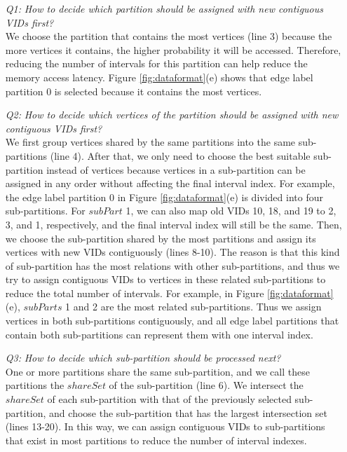 \begin{itemize}
  \item[\emph{Q1:}] \emph{How to decide which partition should be assigned with new contiguous VIDs first?}\\We choose the partition that contains the most vertices (line 3) because the more vertices it contains, the higher probability it will be accessed. Therefore, reducing the number of intervals for this partition can help reduce the memory access latency. Figure \ref{fig:dataformat}(e) shows that edge label partition 0 is selected because it contains the most vertices.
  \item[\emph{Q2:}] \emph{How to decide which vertices of the partition should be assigned with new contiguous VIDs first?}\\We first group vertices shared by the same partitions into the same sub-partitions (line 4). After that, we only need to choose the best suitable sub-partition instead of vertices because vertices in a sub-partition can be assigned in any order without affecting the final interval index. For example, the edge label partition 0 in Figure \ref{fig:dataformat}(e) is divided into four sub-partitions. For $subPart$ 1, we can also map old VIDs 10, 18, and 19 to 2, 3, and 1, respectively, and the final interval index will still be the same. Then, we choose the sub-partition shared by the most partitions and assign its vertices with new VIDs contiguously (lines 8-10). The reason is that this kind of sub-partition has the most relations with other sub-partitions, and thus we try to assign contiguous VIDs to vertices in these related sub-partitions to reduce the total number of intervals. For example, in Figure \ref{fig:dataformat}(e), $subParts$ 1 and 2 are the most related sub-partitions. Thus we assign vertices in both sub-partitions contiguously, and all edge label partitions that contain both sub-partitions can represent them with one interval index.
  \item[\emph{Q3:}] \emph{How to decide which sub-partition should be processed next?}\\One or more partitions share the same sub-partition, and we call these partitions the $shareSet$ of the sub-partition (line 6). We intersect the $shareSet$ of each sub-partition with that of the previously selected sub-partition, and choose the sub-partition that has the largest intersection set (lines 13-20). In this way, we can assign contiguous VIDs to sub-partitions that exist in most partitions to reduce the number of interval indexes.
\end{itemize}

